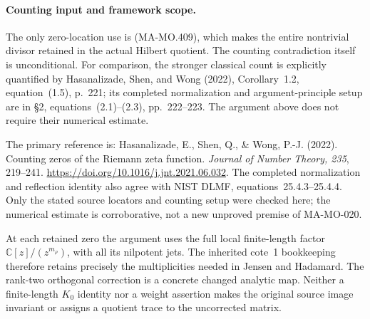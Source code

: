 \paragraph{Counting input and framework scope.}
The only zero-location use is (MA-MO.409), which makes the
entire nontrivial divisor retained in the actual Hilbert
quotient. The counting contradiction itself is unconditional.
For comparison, the stronger classical count is explicitly
quantified by Hasanalizade, Shen, and Wong (2022),
Corollary~1.2, equation~(1.5), p.~221; its completed
normalization and argument-principle setup are in \S2,
equations~(2.1)--(2.3), pp.~222--223. The argument above
does not require their numerical estimate.

The primary reference is: Hasanalizade, E., Shen, Q., \&
Wong, P.-J. (2022). Counting zeros of the Riemann zeta
function. \emph{Journal of Number Theory, 235}, 219--241.
\url{https://doi.org/10.1016/j.jnt.2021.06.032}.
The completed normalization and reflection identity also
agree with NIST DLMF, equations~25.4.3--25.4.4.
Only the stated source locators and counting setup were
checked here; the numerical estimate is corroborative,
not a new unproved premise of MA-MO-020.

At each retained zero the argument uses the full local
finite-length factor \(\mathbb C[z]/(z^{m_\rho})\),
with all its nilpotent jets. The inherited cote~1 bookkeeping
therefore retains precisely the multiplicities needed in
Jensen and Hadamard. The rank-two orthogonal correction
is a concrete changed analytic map. Neither a finite-length
\(K_0\) identity nor a weight assertion makes the original
source image invariant or assigns a quotient trace to the
uncorrected matrix.
